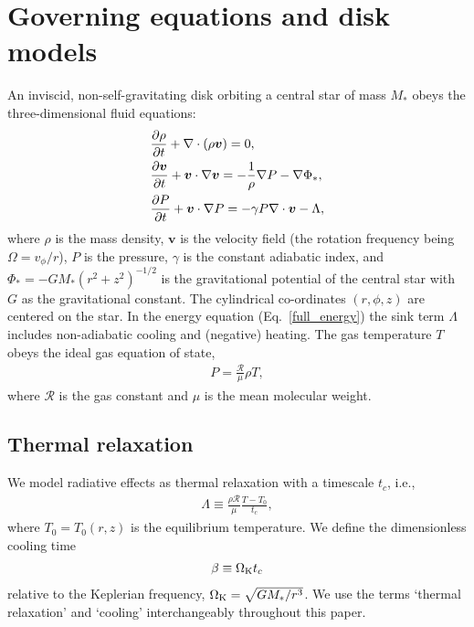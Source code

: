 \section{Governing equations and disk models}\label{setup}
An inviscid, non-self-gravitating disk orbiting a central star of mass $M_*$
obeys the three-dimensional fluid equations:
\begin{align}
  &\frac{\p\rho}{\p t} + \nabla\cdot{\left(\rho\bm{v}\right)} = 0,\label{full_mass}\\
  &\frac{\p\bm{v}}{\p t} + \bm{v}\cdot\nabla\bm{v} =
  -\frac{1}{\rho}\nabla P - \nabla\Phi_*,\\
  &\frac{\p P}{\p t} + \bm{v}\cdot\nabla P  = - \gamma P
  \nabla\cdot\bm{v} - \Lambda %
  , \label{full_energy}
\end{align}
where $\rho$ is the mass density, $\bm{v}$ is the velocity field (the
rotation frequency being $\Omega=v_\phi/r$), $P$
is the pressure, $\gamma$ is the constant adiabatic index, and $\Phi_*
= -GM_*(r^2 + z^2)^{-1/2}$ is the gravitational potential of the
central star with $G$ as the gravitational constant. The cylindrical
co-ordinates $(r,\phi, z)$ are centered on the star. 
In the energy equation (Eq.\ \ref{full_energy}) the sink term
$\Lambda$ includes non-adiabatic cooling and (negative) heating. 
The gas temperature $T$ obeys the ideal gas 
equation of state,  
\begin{align}
P = \frac{\mathcal{R}}{\mu}\rho T,
\end{align}
where $\mathcal{R}$ is the gas constant and $\mu$ is the mean molecular
weight.    

\subsection{Thermal relaxation}
We model radiative effects as thermal
relaxation with a timescale $t_c$, i.e.,
\begin{align}\label{thermal_relax}
  \Lambda  \equiv \frac{\rho\mathcal{R}}{\mu}\frac{T - T_0}{t_c},
\end{align}
where $T_0=T_0(r,z)$ is the equilibrium temperature.  We 
define the dimensionless cooling time 
\begin{align}\label{beta_def}
  \beta \equiv \Omega_{\rm K} t_c
\end{align}
relative to the Keplerian frequency, $\Omega_{\rm K}=\sqrt{GM_*/r^3}$.  We 
use the terms `thermal relaxation' and `cooling' interchangeably
throughout this paper.   


